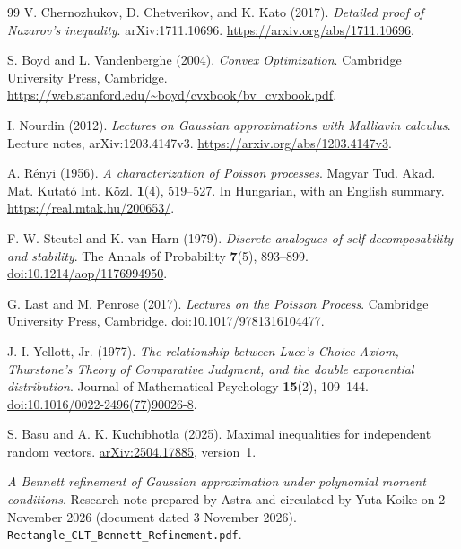 \documentclass[11pt,letterpaper]{article}
\theoremstyle{remark}
\begin{document}
\begin{thebibliography}{99}
V. Chernozhukov, D. Chetverikov, and K. Kato (2017).
\emph{Detailed proof of Nazarov's inequality}.
arXiv:1711.10696.
\url{https://arxiv.org/abs/1711.10696}.

S. Boyd and L. Vandenberghe (2004).
\emph{Convex Optimization}.
Cambridge University Press, Cambridge.
\url{https://web.stanford.edu/~boyd/cvxbook/bv_cvxbook.pdf}.

I. Nourdin (2012).
\emph{Lectures on Gaussian approximations with Malliavin calculus}.
Lecture notes, arXiv:1203.4147v3.
\url{https://arxiv.org/abs/1203.4147v3}.

A. R\'enyi (1956).
\emph{A characterization of Poisson processes}.
Magyar Tud. Akad. Mat. Kutat\'o Int. K\"ozl. \textbf{1}(4), 519--527.
In Hungarian, with an English summary.
\url{https://real.mtak.hu/200653/}.

F. W. Steutel and K. van Harn (1979).
\emph{Discrete analogues of self-decomposability and stability}.
The Annals of Probability \textbf{7}(5), 893--899.
\href{https://doi.org/10.1214/aop/1176994950}{doi:10.1214/aop/1176994950}.

G. Last and M. Penrose (2017).
\emph{Lectures on the Poisson Process}.
Cambridge University Press, Cambridge.
\href{https://doi.org/10.1017/9781316104477}{doi:10.1017/9781316104477}.

J. I. Yellott, Jr. (1977).
\emph{The relationship between Luce's Choice Axiom, Thurstone's Theory
of Comparative Judgment, and the double exponential distribution}.
Journal of Mathematical Psychology \textbf{15}(2), 109--144.
\href{https://doi.org/10.1016/0022-2496(77)90026-8}{doi:10.1016/0022-2496(77)90026-8}.

S. Basu and A. K. Kuchibhotla (2025).
Maximal inequalities for independent random vectors.
\href{https://arxiv.org/abs/2504.17885}{arXiv:2504.17885}, version~1.

\emph{A Bennett refinement of Gaussian approximation under polynomial
moment conditions}. Research note prepared by Astra and circulated by
Yuta Koike on 2 November 2026 (document dated 3 November 2026).
\texttt{Rectangle\_CLT\_Bennett\_Refinement.pdf}.
\end{thebibliography}

\clearpage
\appendix
{}
\end{document}
